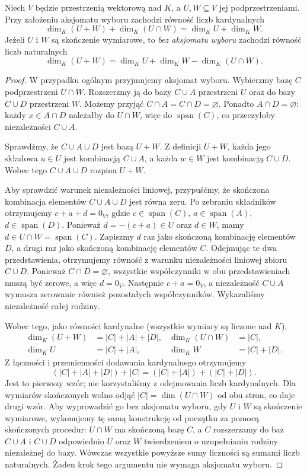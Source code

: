 \begin{twierdzenie}
\label{thm:lin2-wzor-wymiarowy}
Niech \(V\) będzie przestrzenią wektorową nad \(K\),
a \(U,W\subseteq V\) jej podprzestrzeniami.
Przy założeniu aksjomatu wyboru zachodzi równość
liczb kardynalnych
\[
 \dim_K(U+W)+\dim_K(U\cap W)=\dim_KU+\dim_KW.
\]
Jeżeli \(U\) i \(W\) są skończenie wymiarowe,
to \emph{bez aksjomatu wyboru} zachodzi
równość liczb naturalnych
\[
 \dim_K(U+W)=\dim_KU+\dim_KW-\dim_K(U\cap W).
\]
\end{twierdzenie}
\begin{proof}
W przypadku ogólnym przyjmujemy aksjomat wyboru.
Wybierzmy bazę \(C\) podprzestrzeni \(U\cap W\).
Rozszerzmy ją do bazy \(C\cup A\) przestrzeni \(U\)
oraz do bazy \(C\cup D\) przestrzeni \(W\).
Możemy przyjąć \(C\cap A=C\cap D=\varnothing\).
Ponadto \(A\cap D=\varnothing\):
każdy \(x\in A\cap D\) należałby do \(U\cap W\),
więc do \(\operatorname{span}(C)\),
co przeczyłoby niezależności \(C\cup A\).

Sprawdźmy, że \(C\cup A\cup D\) jest bazą \(U+W\).
Z definicji \(U+W\), każda jego składowa
\(u\in U\) jest kombinacją \(C\cup A\),
a każda \(w\in W\) jest kombinacją \(C\cup D\).
Wobec tego \(C\cup A\cup D\) rozpina \(U+W\).

Aby sprawdzić warunek niezależności liniowej,
przypuśćmy, że skończona kombinacja
elementów \(C\cup A\cup D\) jest równa zeru.
Po zebraniu składników otrzymujemy
\(c+a+d=0_V\), gdzie
\(c\in\operatorname{span}(C)\),
\(a\in\operatorname{span}(A)\),
\(d\in\operatorname{span}(D)\).
Ponieważ \(d=-(c+a)\in U\) oraz \(d\in W\),
mamy \(d\in U\cap W=\operatorname{span}(C)\).
Zapiszmy \(d\) raz jako skończoną kombinację
elementów \(D\), a drugi raz jako skończoną kombinację
elementów \(C\). Odejmując te dwa przedstawienia,
otrzymujemy równość z warunku niezależności liniowej
zbioru \(C\cup D\). Ponieważ \(C\cap D=\varnothing\),
wszystkie współczynniki w obu przedstawieniach
muszą być zerowe, a więc \(d=0_V\).
Następnie \(c+a=0_V\), a niezależność
\(C\cup A\) wymusza zerowanie również
pozostałych współczynników.
Wykazaliśmy niezależność całej rodziny.

Wobec tego, jako równości kardynalne
(wszystkie wymiary są liczone nad \(K\)),
\[
 \begin{aligned}
 \dim_K(U+W)&=|C|+|A|+|D|,&
 \dim_K(U\cap W)&=|C|,\\
 \dim_K U&=|C|+|A|,&
 \dim_K W&=|C|+|D|.
 \end{aligned}
\]
Z łączności i przemienności dodawania
kardynalnego otrzymujemy
\[
 (|C|+|A|+|D|)+|C|
 =(|C|+|A|)+(|C|+|D|).
\]
Jest to pierwszy wzór; nie korzystaliśmy
z odejmowania liczb kardynalnych.
Dla wymiarów skończonych wolno odjąć
\(|C|=\dim(U\cap W)\) od obu stron,
co daje drugi wzór.
Aby wyprowadzić go bez aksjomatu wyboru,
gdy \(U\) i \(W\) są skończenie wymiarowe,
wykonujemy tę samą konstrukcję od początku
za pomocą skończonych procedur:
\(U\cap W\) ma skończoną bazę \(C\),
a \(C\) rozszerzamy do baz \(C\cup A\)
i \(C\cup D\) odpowiednio \(U\) oraz \(W\)
twierdzeniem o uzupełnianiu rodziny niezależnej
do bazy. Wówczas wszystkie powyższe sumy
liczności są sumami liczb naturalnych.
Żaden krok tego argumentu nie wymaga
aksjomatu wyboru.
\end{proof}

